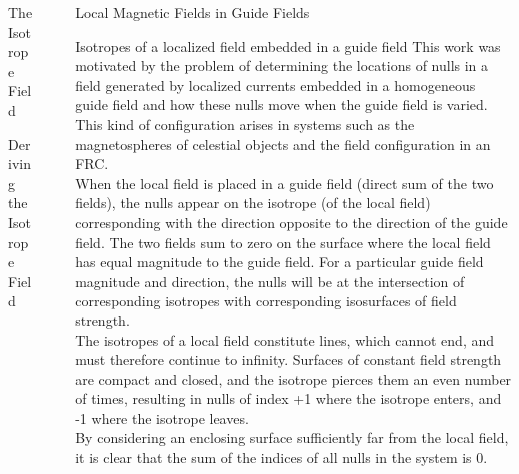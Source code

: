 \documentclass[final]{beamer}
\newlength{\sepwid}
\newlength{\onecolwid}
\begin{document}
\begin{frame}[t]
\begin{columns}[t]
\begin{column}{\onecolwid}
\begin{block}{\huge{The Isotrope Field}}
\begin{block}{Deriving the Isotrope Field}
\end{block}

\end{block}
\end{column}


\begin{column}{\sepwid}\end{column} %
\begin{column}{\onecolwid} %

\begin{block}{\huge{Local Magnetic Fields in Guide Fields}}
\begin{block}{Isotropes of a localized field embedded in a guide field}
  This work was motivated by the problem of determining the locations of nulls in a field generated by
  localized currents embedded in a homogeneous guide field
  and how these nulls move when the guide field is varied.
  This kind of configuration arises in systems such as the magnetospheres of celestial objects and
  the field configuration in an FRC.\\
  When the local field is placed in a guide field (direct sum of the two fields), the
  nulls appear on the isotrope (of the local field) corresponding with the direction opposite to the
  direction of the guide field. 
  The two fields sum to zero on the surface where the local field has equal magnitude to the guide field. 
  For a particular guide field magnitude and direction, the nulls will be at the intersection of
  corresponding isotropes with corresponding isosurfaces of field strength.\\
  The isotropes of a local field constitute lines, which cannot end,
  and must therefore continue to infinity. 
  Surfaces of constant field strength are compact and closed, and the isotrope pierces
  them an even number of times, resulting in nulls of index +1 where the isotrope
  enters, and -1 where the isotrope leaves.\\
  By considering an enclosing surface sufficiently far from the local field,
  it is clear that the sum of the indices of all nulls in the system is 0.
    
\end{block}
  

\end{block}
\end{column}
\end{columns}
\end{frame}
\end{document}
